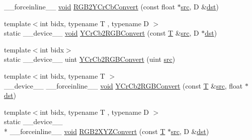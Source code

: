 \begin{DoxyCompactItemize}
\-\_\-\-\_\-forceinline\-\_\-\-\_\- \hyperlink{legacy_8hpp_a8bb47f092d473522721002c86c13b94e}{void} \hyperlink{namespacecv_1_1gpu_1_1device_1_1color__detail_a938918e504e9f7a2987b3829761d9775}{R\-G\-B2\-Y\-Cr\-Cb\-Convert} (const float $\ast$\hyperlink{legacy_8hpp_a371cd109b74033bc4366f584edd3dacc}{src}, D \&\hyperlink{photo__c_8h_aed13e2a25279b24dc954073233fef7a5}{dst})
\item 
{\footnotesize template$<$int bidx, typename T , typename D $>$ }\\static \-\_\-\-\_\-device\-\_\-\-\_\- \hyperlink{legacy_8hpp_a8bb47f092d473522721002c86c13b94e}{void} \hyperlink{namespacecv_1_1gpu_1_1device_1_1color__detail_a0aa00f887f692adbc0123c8ce98056b3}{Y\-Cr\-Cb2\-R\-G\-B\-Convert} (const \hyperlink{calib3d_8hpp_a3efb9551a871ddd0463079a808916717}{T} \&\hyperlink{legacy_8hpp_a371cd109b74033bc4366f584edd3dacc}{src}, D $\ast$\hyperlink{photo__c_8h_aed13e2a25279b24dc954073233fef7a5}{dst})
\item 
{\footnotesize template$<$int bidx$>$ }\\static \-\_\-\-\_\-device\-\_\-\-\_\- uint \hyperlink{namespacecv_1_1gpu_1_1device_1_1color__detail_aa12a2b8f126aeb508198f8700509a791}{Y\-Cr\-Cb2\-R\-G\-B\-Convert} (uint \hyperlink{legacy_8hpp_a371cd109b74033bc4366f584edd3dacc}{src})
\item 
{\footnotesize template$<$int bidx, typename T $>$ }\\\-\_\-\-\_\-device\-\_\-\-\_\- \-\_\-\-\_\-forceinline\-\_\-\-\_\- \hyperlink{legacy_8hpp_a8bb47f092d473522721002c86c13b94e}{void} \hyperlink{namespacecv_1_1gpu_1_1device_1_1color__detail_ab80a65f0957796a662eecdad97af8bee}{Y\-Cr\-Cb2\-R\-G\-B\-Convert} (const \hyperlink{calib3d_8hpp_a3efb9551a871ddd0463079a808916717}{T} \&\hyperlink{legacy_8hpp_a371cd109b74033bc4366f584edd3dacc}{src}, float $\ast$\hyperlink{photo__c_8h_aed13e2a25279b24dc954073233fef7a5}{dst})
\item 
{\footnotesize template$<$int bidx, typename T , typename D $>$ }\\static \-\_\-\-\_\-device\-\_\-\-\_\- \\*
\-\_\-\-\_\-forceinline\-\_\-\-\_\- \hyperlink{legacy_8hpp_a8bb47f092d473522721002c86c13b94e}{void} \hyperlink{namespacecv_1_1gpu_1_1device_1_1color__detail_a3d66004547436825daecdc3b80907e8b}{R\-G\-B2\-X\-Y\-Z\-Convert} (const \hyperlink{calib3d_8hpp_a3efb9551a871ddd0463079a808916717}{T} $\ast$\hyperlink{legacy_8hpp_a371cd109b74033bc4366f584edd3dacc}{src}, D \&\hyperlink{photo__c_8h_aed13e2a25279b24dc954073233fef7a5}{dst})
\item 

\end{DoxyCompactItemize}
